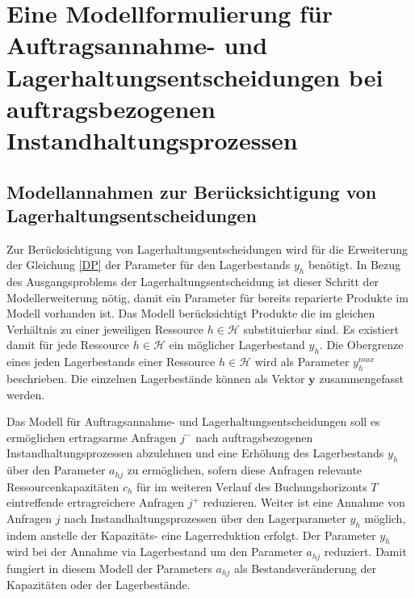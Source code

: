 \chapter{Eine Modellformulierung für Auftragsannahme- und Lagerhaltungsentscheidungen bei auftragsbezogenen Instandhaltungsprozessen}\label{HauptteilDP}
\setcounter{footnote}{86}

\section{Modellannahmen zur Berücksichtigung von Lagerhaltungsentscheidungen}


Zur Berücksichtigung von Lagerhaltungsentscheidungen wird für die Erweiterung der Gleichung \eqref{DP} der Parameter für den Lagerbestands $y_{h}$ benötigt. In Bezug des Ausgangsproblems der Lagerhaltungsentscheidung ist dieser Schritt der Modellerweiterung nötig, damit ein Parameter für bereits reparierte Produkte im Modell vorhanden ist. Das Modell berücksichtigt Produkte die im gleichen Verhältnis zu einer jeweiligen Ressource $h\in\mathcal{H}$ substituierbar sind. Es existiert damit für jede Ressource $h\in\mathcal{H}$ ein möglicher Lagerbestand $y_h$. Die Obergrenze eines jeden Lagerbestands einer Ressource $h\in\mathcal{H}$ wird als Parameter $y_{h}^{max}$ beschrieben. Die einzelnen Lagerbestände können als Vektor $\textbf{y}$ zusammengefasst werden. %


Das Modell für Auftragsannahme- und Lagerhaltungsentscheidungen soll es ermöglichen ertragsarme Anfragen $j^{-}$ nach auftragsbezogenen Instandhaltungsprozessen abzulehnen und eine Erhöhung des Lagerbestands $y_{h}$ über den Parameter $a_{hj}$ zu ermöglichen, sofern diese Anfragen relevante Ressourcenkapazitäten $c_{h}$ für im weiteren Verlauf des Buchungshorizonts $T$ eintreffende ertragreichere Anfragen $j^{+}$ reduzieren. Weiter ist eine Annahme von Anfragen $j$ nach Instandhaltungsprozessen über den Lagerparameter $y_{h}$ möglich, indem anstelle der Kapazitäts- eine Lagerreduktion erfolgt. Der Parameter $y_{h}$ wird bei der Annahme via Lagerbestand um den Parameter $a_{hj}$ reduziert. Damit fungiert in diesem Modell der Parameters $a_{hj}$ als Bestandsveränderung der Kapazitäten oder der Lagerbestände. 

